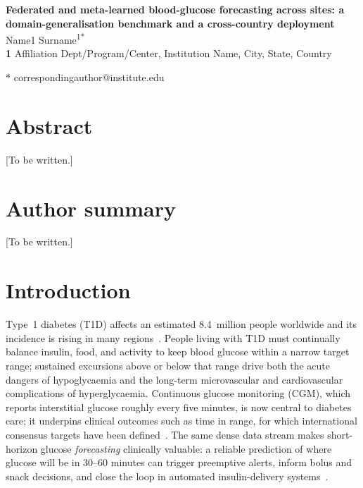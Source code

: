 \documentclass[10pt,letterpaper]{article}
\begin{document}
\vspace*{0.2in}

\begin{flushleft}
{\Large
\textbf{Federated and meta-learned blood-glucose forecasting across sites: a domain-generalisation benchmark and a cross-country deployment}
}
\newline
\\
Name1 Surname\textsuperscript{1*}
\\
\bigskip
\textbf{1} Affiliation Dept/Program/Center, Institution Name, City, State, Country
\\
\bigskip

* correspondingauthor@institute.edu

\end{flushleft}

\section*{Abstract}
[To be written.]

\section*{Author summary}
[To be written.]

\clearpage
{}
\linenumbers

\section*{Introduction}

Type~1 diabetes (T1D) affects an estimated 8.4~million people worldwide and its
incidence is rising in many regions~\cite{idf2021,gregory2022t1dindex}. People living with T1D must
continually balance insulin, food, and activity to keep blood glucose within a
narrow target range; sustained excursions above or below that range drive both
the acute dangers of hypoglycaemia and the long-term microvascular and
cardiovascular complications of hyperglycaemia. Continuous glucose monitoring
(CGM), which reports interstitial glucose roughly every five minutes, is now
central to diabetes care; it underpins clinical outcomes such as time in range,
for which international consensus targets have been defined~\cite{battelino2019tir}. The same dense data stream makes
short-horizon glucose \emph{forecasting} clinically valuable: a reliable
prediction of where glucose will be in 30--60 minutes can trigger preemptive
alerts, inform bolus and snack decisions, and close the loop in automated
insulin-delivery systems~\cite{vettoretti2020advanced,bekiari2018ap}.
\end{document}
